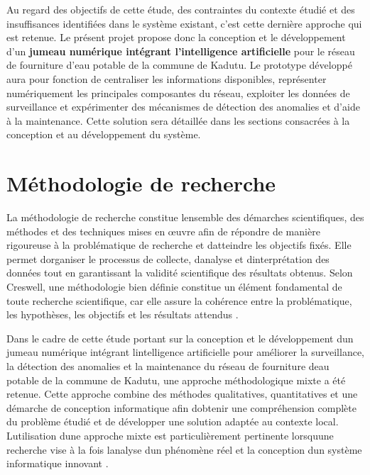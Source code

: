 Au regard des objectifs de cette étude, des contraintes du contexte
étudié et des insuffisances identifiées dans le système existant, c'est
cette dernière approche qui est retenue. Le présent projet propose donc
la conception et le développement d'un \textbf{jumeau numérique
	intégrant l'intelligence artificielle} pour le réseau de fourniture
d'eau potable de la commune de Kadutu. Le prototype développé aura pour
fonction de centraliser les informations disponibles, représenter
numériquement les principales composantes du réseau, exploiter les
données de surveillance et expérimenter des mécanismes de détection des
anomalies et d'aide à la maintenance. Cette solution sera détaillée
dans les sections consacrées à la conception et au développement du
système.

\section{Méthodologie de recherche}\label{muxe9thodologie-de-recherche}

La méthodologie de recherche constitue l\textquotesingle ensemble des
démarches scientifiques, des méthodes et des techniques mises en œuvre
afin de répondre de manière rigoureuse à la problématique de recherche
et d\textquotesingle atteindre les objectifs fixés. Elle permet
d\textquotesingle organiser le processus de collecte,
d\textquotesingle analyse et d\textquotesingle interprétation des
données tout en garantissant la validité scientifique des résultats
obtenus. Selon Creswell, une méthodologie bien définie constitue un
élément fondamental de toute recherche scientifique, car elle assure la
cohérence entre la problématique, les hypothèses, les objectifs et les
résultats attendus \cite{ref75}.

Dans le cadre de cette étude portant sur la conception et le
développement d\textquotesingle un jumeau numérique intégrant
l\textquotesingle intelligence artificielle pour améliorer la
surveillance, la détection des anomalies et la maintenance du réseau de
fourniture d\textquotesingle eau potable de la commune de Kadutu, une
approche méthodologique mixte a été retenue. Cette approche combine des méthodes
qualitatives, quantitatives et une démarche de conception informatique
afin d\textquotesingle obtenir une compréhension complète du problème
étudié et de développer une solution adaptée au contexte local.
L\textquotesingle utilisation d\textquotesingle une approche mixte est
particulièrement pertinente lorsqu\textquotesingle une recherche vise à
la fois l\textquotesingle analyse d\textquotesingle un phénomène réel et
la conception d\textquotesingle un système informatique innovant
\cite{ref100}.

